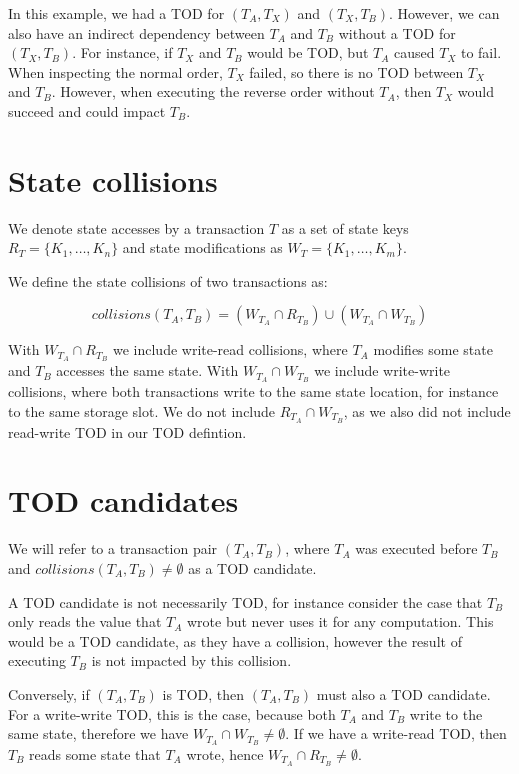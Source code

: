 \documentclass[draft,final]{vutinfth} %
\begin{document}
In this example, we had a TOD for $(T_A, T_X)$ and $(T_X, T_B)$. However, we can also have an indirect dependency between $T_A$ and $T_B$ without a TOD for $(T_X, T_B)$. For instance, if $T_X$ and $T_B$ would be TOD, but $T_A$ caused $T_X$ to fail. When inspecting the normal order, $T_X$ failed, so there is no TOD between $T_X$ and $T_B$. However, when executing the reverse order without $T_A$, then $T_X$ would succeed and could impact $T_B$.

\section{State collisions}

We denote state accesses by a transaction $T$ as a set of state keys $R_T = \{ K_1, \dots, K_n \}$ and state modifications as $W_T = \{ K_1, \dots, K_m \}$.

We define the state collisions of two transactions as:

$$collisions(T_A, T_B) = (W_{T_A} \cap R_{T_B}) \cup (W_{T_A} \cap W_{T_B})$$

With $W_{T_A} \cap R_{T_B}$ we include write-read collisions, where $T_A$ modifies some state and $T_B$ accesses the same state. With $W_{T_A} \cap W_{T_B}$ we include write-write collisions, where both transactions write to the same state location, for instance to the same storage slot. We do not include $R_{T_A} \cap W_{T_B}$, as we also did not include read-write TOD in our TOD defintion.

\section{TOD candidates}

We will refer to a transaction pair $(T_A, T_B)$, where $T_A$ was executed before $T_B$ and $collisions(T_A, T_B) \neq \emptyset$ as a TOD candidate.

A TOD candidate is not necessarily TOD, for instance consider the case that $T_B$ only reads the value that $T_A$ wrote but never uses it for any computation. This would be a TOD candidate, as they have a collision, however the result of executing $T_B$ is not impacted by this collision.

Conversely, if $(T_A, T_B)$ is TOD, then $(T_A, T_B)$ must also a TOD candidate. For a write-write TOD, this is the case, because both $T_A$ and $T_B$ write to the same state, therefore we have $W_{T_A} \cap W_{T_B} \neq \emptyset$. If we have a write-read TOD, then $T_B$ reads some state that $T_A$ wrote, hence $W_{T_A} \cap R_{T_B} \neq \emptyset$.
\end{document}
